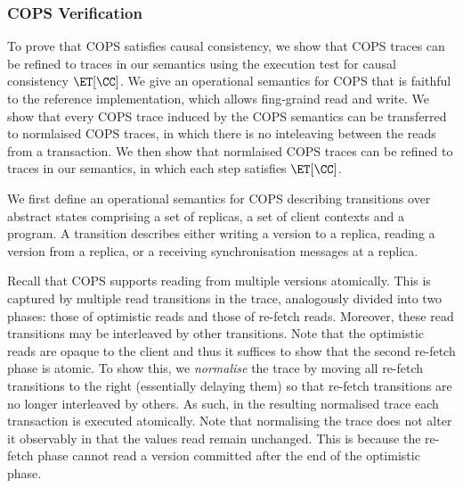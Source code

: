 


\subsubsection{COPS Verification} To prove that COPS satisfies causal consistency,
we show that COPS traces can be refined to traces in our semantics using the execution test for causal consistency \( \ET[\CC] \).
We give an operational semantics for COPS that is faithful to the reference implementation, which allows fing-graind read and write.
We show that every COPS trace induced by the COPS semantics can be transferred to normlaised COPS traces, 
in which there is no inteleaving between the reads from a transaction.
We then show that normlaised COPS traces can be refined to traces in our semantics, in which each step satisfies \( \ET[\CC] \).

We first define an operational semantics for COPS 
describing transitions over abstract states comprising a set of replicas, a set of client contexts and a program.
A transition describes either writing a version to a replica, 
reading a version from a replica, or a receiving synchronisation messages at a replica.

Recall that COPS supports reading from multiple versions atomically. 
This is captured by multiple read transitions in the trace, analogously divided into two phases: those of optimistic reads and those of re-fetch reads.
Moreover, these read transitions may be interleaved by other transitions. 
Note that the optimistic reads are opaque to the client and
thus it suffices to show that the second re-fetch phase is atomic.
To show this, we \emph{normalise} the trace by moving all re-fetch transitions to the right (essentially delaying them) so that re-fetch transitions are no longer interleaved by others.
As such, in the resulting normalised trace each transaction is executed atomically. 
Note that normalising the trace does not alter it observably in that the values read remain unchanged. 
This is because the re-fetch phase cannot read a version committed after the end of the optimistic phase.



